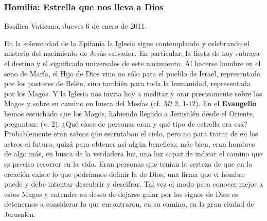 {\subsubsection{Homilía: Estrella que nos lleva a Dios}

Basílica Vaticana. Jueves 6 de enero de 2011.

En la solemnidad de la Epifanía la Iglesia sigue contemplando y celebrando el misterio del nacimiento de Jesús salvador. En particular, la fiesta de hoy subraya el destino y el significado universales de este nacimiento. Al hacerse hombre en el seno de María, el Hijo de Dios vino no sólo para el pueblo de Israel, representado por los pastores de Belén, sino también para toda la humanidad, representada por los Magos. Y la Iglesia nos invita hoy a meditar y orar precisamente sobre los Magos y sobre su camino en busca del Mesías (cf. \emph{Mt} 2, 1-12). En el \textbf{Evangelio} hemos escuchado que los Magos, habiendo llegado a Jerusalén desde el Oriente, preguntan:  (v. 2). ¿Qué clase de personas eran y qué tipo de estrella era esa? Probablemente eran sabios que escrutaban el cielo, pero no para tratar de  en los astros el futuro, quizá para obtener así algún beneficio; más bien, eran hombres  de algo más, en busca de la verdadera luz, una luz capaz de indicar el camino que es preciso recorrer en la vida. Eran personas que tenían la certeza de que en la creación existe lo que podríamos definir la  de Dios, una firma que el hombre puede y debe intentar descubrir y descifrar. Tal vez el modo para conocer mejor a estos Magos y entender su deseo de dejarse guiar por los signos de Dios es detenernos a considerar lo que encontraron, en su camino, en la gran ciudad de Jerusalén.

}
